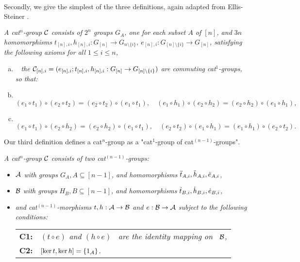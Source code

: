 \medskip 
Secondly, we give the simplest of the three definitions, 
again adapted from Ellis-Steiner \cite{ell:st}. 
\begin{defn} \label{defn:catnb} 
\emph{A cat$^n$-group  $\mathcal{C}$ consists of $2^n$ groups 
$G_A$, one for each subset  $A$  of  $[n]$, 
and $3n$ homomorphisms 
$t_{[n],i}, h_{[n],i} : G_{[n]} \to G_{n \setminus \{i\}},~ 
 e_{[n],i} : G_{[n] \setminus \{i\}} \to G_{[n]}$,  
satisfying the following axioms for all $1 \leqslant i \leqslant n$,}  
\begin{enumerate}[(a)]
\item~ \emph{the 
$
\mathcal{C}_{[n],i} = (e_{[n],i};t_{[n],i},h_{[n],i}:G_{[n]} \to G_{[n] \setminus \{i\}}) 
$
are \emph{commuting} cat$^1$-groups, so that:} 
\item~ 
$
(e_1 \circ t_1) \circ (e_2 \circ t_2) = (e_2 \circ t_2) \circ (e_1 \circ t_1), \quad
(e_1 \circ h_1) \circ (e_2 \circ h_2) = (e_2 \circ h_2) \circ (e_1 \circ h_1), 
$
\item~ 
$
(e_1 \circ t_1) \circ (e_2 \circ h_2) = (e_2 \circ h_2) \circ (e_1 \circ t_1), \quad 
(e_2 \circ t_2) \circ (e_1 \circ h_1) = (e_1 \circ h_1) \circ (e_2 \circ t_2). 
$
\end{enumerate}
\end{defn} 

\medskip 
Our third definition defines a cat$^n$-group as a 
"cat$^1$-group of cat$^{(n-1)}$-groups". 
\begin{defn} \label{defn:catnc} 
\emph{A cat$^n$-group $\mathcal{C}$ consists of two cat$^{(n-1)}$-groups:} 
\begin {itemize} 
\item
\emph{$\mathcal{A}$ with groups $G_A, A \subseteq [n-1]$, 
and homomorphisms $\ddot{t}_{A,i}, \ddot{h}_{A,i}, \ddot{e}_{A,i}$,} 
\item 
\emph{$\mathcal{B}$ with groups $H_B, B \subseteq [n-1]$,
and homomorphisms $\dot{t}_{B,i}, \dot{h}_{B,i}, \dot{e}_{B,i}$,} 
\item 
\emph{and cat$^{(n-1)}$-morphisms $t,h : \mathcal{A} \to \mathcal{B}$ 
and $e : \mathcal{B} \to \mathcal{A}$
subject to the following conditions:} 
\begin{center}
\begin{tabular}{r l}
\textbf{C1:}  &  \emph{$(t \circ e)$ and $(h \circ e)$~ 
                 are the identity mapping on~ $\mathcal{B}$,} \\
\textbf{C2:}  &  $[\ker t, \ker h] = \{ 1_{\mathcal{A}} \}$.
\end{tabular}
\end{center}
\end{itemize}
\end{defn}


